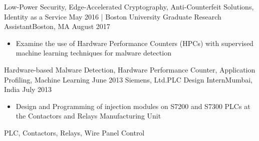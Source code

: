 \begin{experiences}
{\begin{itemize}
                      \end{itemize}
                    }
                    {Low-Power Security, Edge-Accelerated Cryptography, Anti-Counterfeit Solutions, Identity as a Service}
  \emptySeparator
  \experience
  {May 2016}       {| Boston University}{ Graduate Research Assistant}{Boston, MA}
  {August 2017}    {
                      \begin{itemize}
                        \item Examine the use of Hardware Performance Counters (HPCs) with supervised machine learning techniques for malware detection
                      \end{itemize}
                    }
                    {Hardware-based Malware Detection, Hardware Performance Counter, Application Profiling, Machine Learning}
  \emptySeparator
  \experience
    {June 2013}     {Siemens, Ltd.}{PLC Design Intern}{Mumbai, India}
    {July 2013}    {
                      \begin{itemize}
                        \item Design and Programming of injection modules on S7200 and S7300 PLCs at the Contactors and Relays Manufacturing Unit \\
                      \end{itemize}
                    }
                    {PLC, Contactors, Relays, Wire Panel Control}
\end{experiences}
